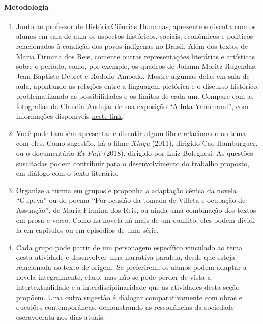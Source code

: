 \documentclass[12pt]{extarticle}
\begin{document}
\paragraph{Metodologia} 
\begin{enumerate}
\item
Junto ao professor de História\,Ciências Humanas, apresente 
e discuta com os alunos em sala de aula os aspectos históricos, 
sociais, econômicos e políticos
relacionados à condição dos povos indígenas no Brasil. Além dos textos
de Maria Firmina dos Reis, comente outras representações literárias e
artísticas sobre o período, como, por exemplo, os quadros de Johann
Moritz Rugendas, Jean-Baptiste Debret e Rodolfo Amoedo. Mostre algumas
delas em sala de aula, apontando as relações entre a linguagem pictórica
e o discurso histórico, problematizando as possibilidades e os limites
de cada um. Compare com as fotografias de Claudia Andujar de sua
exposição ``A luta Yanomami'', com informações disponíveis \href{https://ims.com.br/exposicao/claudia-andujar-a-luta-yanomami-ims-paulista/}{neste link}.



\item
Você pode também apresentar e discutir algum filme relacionado ao
tema com eles. Como sugestão, há o filme \emph{Xingu} (2011), dirigido
Cao Hamburguer, ou o documentário \emph{Ex-Pajé} (2018), dirigido por
Luiz Bolegnesi. As questões suscitadas podem contribuir para o
desenvolvimento do trabalho proposto, em diálogo com o texto literário.

\item
Organize a turma em grupos e proponha a adaptação cênica da novela
``Gupeva'' ou do poema ``Por ocasião da tomada de Villeta e ocupação de
Assunção'', de Maria Firmina dos Reis, ou ainda uma combinação dos
textos em prosa e verso. Como na novela há mais de um conflito, eles
podem dividi-la em capítulos ou em episódios de uma série.

\item
Cada grupo pode partir de um personagem específico vinculado ao tema
desta atividade e desenvolver uma narrativa paralela, desde que esteja
relacionada ao texto de origem. Se preferirem, os alunos podem adaptar a
novela integralmente, claro, mas não se pode perder de vista a
intertextualidade e a interdisciplinaridade que as atividades desta
seção propõem. Uma outra sugestão é dialogar comparativamente com obras
e questões contemporâneas, demonstrando as ressonâncias da sociedade
escravocrata nos dias atuais.


\end{enumerate}
\end{document}
